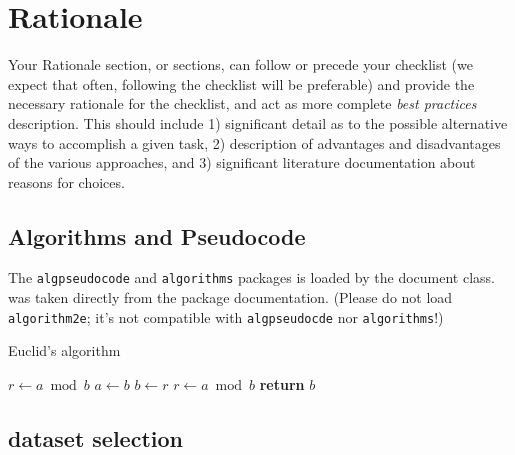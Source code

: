 \documentclass[9pt,bestpractices]{livecoms}
\begin{document}
\section{Rationale}

Your Rationale section, or sections, can follow or precede your checklist (we expect that often, following the checklist will be preferable) and provide the necessary rationale for the checklist, and act as more complete \emph{best practices} description.
This should include 1) significant detail as to the possible alternative ways to accomplish a given task, 2) description of advantages and disadvantages of the various approaches, and 3) significant literature documentation about reasons for choices.

\subsection{Algorithms and Pseudocode}
\label{sec:reference_this}

The \texttt{algpseudocode} and \texttt{algorithms} packages is loaded by the document class.  was taken directly from the package documentation. (Please do not load \texttt{algorithm2e}; it's not compatible with \texttt{algpseudocde} nor \texttt{algorithms}!)

\begin{algorithm}
\caption{Euclid's algorithm}\label{alg:euclid}
\begin{algorithmic}%
   \State $r\gets a\bmod b$
      \State $a\gets b$
      \State $b\gets r$
      \State $r\gets a\bmod b$
   \EndWhile\label{euclidendwhile}
   \State \textbf{return} $b$
\EndProcedure
\end{algorithmic}
\end{algorithm}


\subsection{dataset selection}
\end{document}
